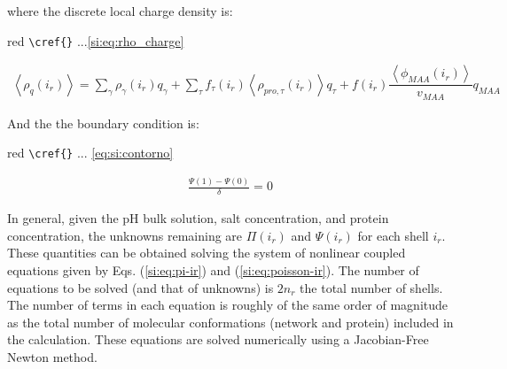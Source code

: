 \documentclass[journal=jacsat,manuscript=suppinfo]{achemso}
\begin{document}
\noindent where the discrete local charge density is:
\begin{color}{red}
	\verb|\cref{}| ...\ref{si:eq:rho_charge}
\end{color}

\begin{align}
	\left<\rho_q(i_r)\right> = \sum_{\gamma } {\rho_\gamma(i_r) q_\gamma + \sum_\tau{f_\tau(i_r) \left<\rho_{pro,\tau}(i_r)\right> q_\tau} +  f(i_r)\dfrac{\left<\phi_{MAA}(i_r)\right>}{v_{MAA}}q_{MAA}}
\end{align}


And the the boundary condition is:
\begin{color}{red}
	\verb|\cref{}| ... \ref{eq:si:contorno}
\end{color}
\begin{align}
	\frac{\Psi(1) - \Psi(0)}{\delta} = 0
\end{align}



In general, given the pH bulk solution, salt concentration, and protein concentration, the
unknowns remaining are $\Pi(i_r)$ and $\Psi(i_r)$ for each shell $i_r$. These quantities can be obtained solving the system of nonlinear coupled equations given by Eqs. (\ref{si:eq:pi-ir}) and (\ref{si:eq:poisson-ir}). The number of equations to be solved (and that of unknowns) is $2n_r$ the total number of shells. The number of terms in each equation is roughly of the same order of magnitude as the total number of molecular conformations (network and protein) included in the calculation. These equations are solved numerically using a Jacobian-Free Newton method.
\end{document}
